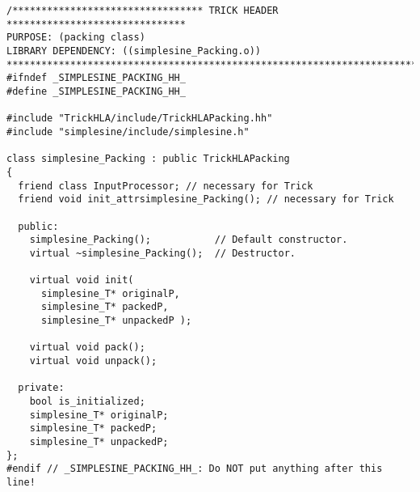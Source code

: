 \begin{lstlisting}[caption={\tt simplesine\_Packing.hh},label={list:simplesine-Packing-hh}]
/********************************* TRICK HEADER *******************************
PURPOSE: (packing class)
LIBRARY DEPENDENCY: ((simplesine_Packing.o))
*******************************************************************************/
#ifndef _SIMPLESINE_PACKING_HH_
#define _SIMPLESINE_PACKING_HH_

#include "TrickHLA/include/TrickHLAPacking.hh"
#include "simplesine/include/simplesine.h"

class simplesine_Packing : public TrickHLAPacking
{
  friend class InputProcessor; // necessary for Trick
  friend void init_attrsimplesine_Packing(); // necessary for Trick

  public:
    simplesine_Packing();           // Default constructor.
    virtual ~simplesine_Packing();  // Destructor.

    virtual void init( 
      simplesine_T* originalP, 
      simplesine_T* packedP,
      simplesine_T* unpackedP );

    virtual void pack();
    virtual void unpack();

  private:
    bool is_initialized;
    simplesine_T* originalP;
    simplesine_T* packedP;
    simplesine_T* unpackedP;
};
#endif // _SIMPLESINE_PACKING_HH_: Do NOT put anything after this line!
\end{lstlisting}
